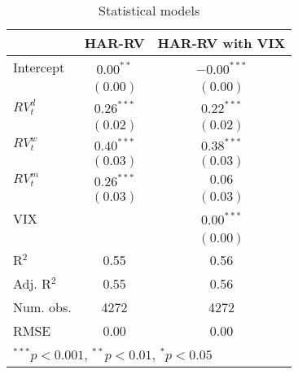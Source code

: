 
\begin{table}
\begin{center}
\begin{tabular}{l c c }
\hline
 & HAR-RV & HAR-RV with VIX \\
\hline
Intercept    & $0.00^{**}$  & $-0.00^{***}$ \\
             & $(0.00)$     & $(0.00)$      \\
$RV_{t}^{d}$ & $0.26^{***}$ & $0.22^{***}$  \\
             & $(0.02)$     & $(0.02)$      \\
$RV_{t}^{w}$ & $0.40^{***}$ & $0.38^{***}$  \\
             & $(0.03)$     & $(0.03)$      \\
$RV_{t}^{m}$ & $0.26^{***}$ & $0.06$        \\
             & $(0.03)$     & $(0.03)$      \\
VIX          &              & $0.00^{***}$  \\
             &              & $(0.00)$      \\
\hline
R$^2$        & 0.55         & 0.56          \\
Adj. R$^2$   & 0.55         & 0.56          \\
Num. obs.    & 4272         & 4272          \\
RMSE         & 0.00         & 0.00          \\
\hline
\multicolumn{3}{l}{\scriptsize{$^{***}p<0.001$, $^{**}p<0.01$, $^*p<0.05$}}
\end{tabular}
\caption{Statistical models}
\label{table:coefficients}
\end{center}
\end{table}

